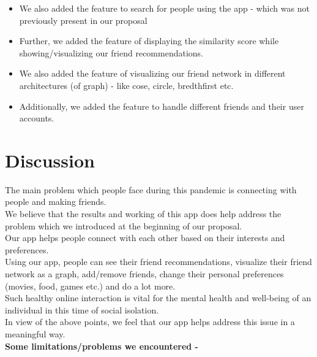 \documentclass[11pt]{report}
\begin{document}
\begin{itemize}
    \item We also added the feature to search for people using the app - which was not previously present in our proposal \\
    
    \item Further, we added the feature of displaying the similarity score while showing/visualizing our friend recommendations.\\
    
    \item We also added the feature of visualizing our friend network in different architectures (of graph) - like cose, circle, bredthfirst etc.\\
    
    \item Additionally, we added the feature to handle different friends and their user accounts.
\end{itemize}

\chapter{Discussion}



The main problem which people face during this pandemic is connecting with people and making friends.\\
We believe that the results and working of this app does help address the problem which we introduced at the beginning of our proposal.\\
Our app helps people connect with each other based on their interests and preferences. \\
Using our app, people can see their friend recommendations, visualize their friend network as a graph, add/remove friends, change their personal preferences (movies, food, games etc.) and do a lot more.\\
Such healthy online interaction is vital for the mental health and well-being of an individual in this time of social isolation.\\
In view of the above points, we feel that our app helps address this issue in a meaningful way.\\
    
    
{\bf Some limitations/problems we encountered -}
\end{document}
